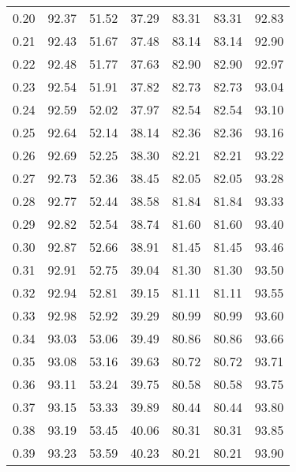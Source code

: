\begin{tabular}{|c|c|c|c|c|c|c|}
      0.20 &     92.37 &     51.52 &      37.29 &   83.31 &      83.31 &         92.83 \\
      0.21 &     92.43 &     51.67 &      37.48 &   83.14 &      83.14 &         92.90 \\
      0.22 &     92.48 &     51.77 &      37.63 &   82.90 &      82.90 &         92.97 \\
      0.23 &     92.54 &     51.91 &      37.82 &   82.73 &      82.73 &         93.04 \\
      0.24 &     92.59 &     52.02 &      37.97 &   82.54 &      82.54 &         93.10 \\
      0.25 &     92.64 &     52.14 &      38.14 &   82.36 &      82.36 &         93.16 \\
      0.26 &     92.69 &     52.25 &      38.30 &   82.21 &      82.21 &         93.22 \\
      0.27 &     92.73 &     52.36 &      38.45 &   82.05 &      82.05 &         93.28 \\
      0.28 &     92.77 &     52.44 &      38.58 &   81.84 &      81.84 &         93.33 \\
      0.29 &     92.82 &     52.54 &      38.74 &   81.60 &      81.60 &         93.40 \\
      0.30 &     92.87 &     52.66 &      38.91 &   81.45 &      81.45 &         93.46 \\
      0.31 &     92.91 &     52.75 &      39.04 &   81.30 &      81.30 &         93.50 \\
      0.32 &     92.94 &     52.81 &      39.15 &   81.11 &      81.11 &         93.55 \\
      0.33 &     92.98 &     52.92 &      39.29 &   80.99 &      80.99 &         93.60 \\
      0.34 &     93.03 &     53.06 &      39.49 &   80.86 &      80.86 &         93.66 \\
      0.35 &     93.08 &     53.16 &      39.63 &   80.72 &      80.72 &         93.71 \\
      0.36 &     93.11 &     53.24 &      39.75 &   80.58 &      80.58 &         93.75 \\
      0.37 &     93.15 &     53.33 &      39.89 &   80.44 &      80.44 &         93.80 \\
      0.38 &     93.19 &     53.45 &      40.06 &   80.31 &      80.31 &         93.85 \\
      0.39 &     93.23 &     53.59 &      40.23 &   80.21 &      80.21 &         93.90 \\

\end{tabular}
